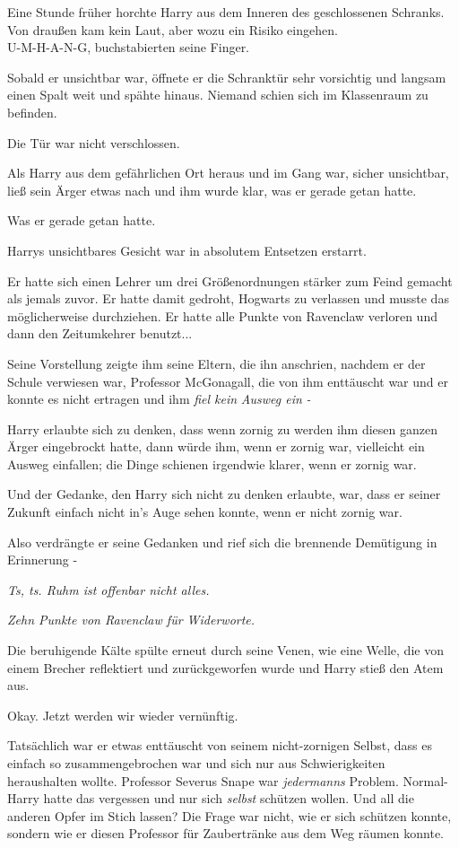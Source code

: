 {\hfill\break Eine Stunde früher horchte Harry aus dem Inneren des geschlossenen Schranks. Von draußen kam kein Laut, aber wozu ein Risiko eingehen.\\ U-M-H-A-N-G, buchstabierten seine Finger.

Sobald er unsichtbar war, öffnete er die Schranktür sehr vorsichtig und langsam einen Spalt weit und spähte hinaus. Niemand schien sich im Klassenraum zu befinden.

Die Tür war nicht verschlossen.

Als Harry aus dem gefährlichen Ort heraus und im Gang war, sicher unsichtbar, ließ sein Ärger etwas nach und ihm wurde klar, was er gerade getan hatte.

Was er gerade getan hatte.

Harrys unsichtbares Gesicht war in absolutem Entsetzen erstarrt.

Er hatte sich einen Lehrer um drei Größenordnungen stärker zum Feind gemacht als jemals zuvor. Er hatte damit gedroht, Hogwarts zu verlassen und musste das möglicherweise durchziehen. Er hatte alle Punkte von Ravenclaw verloren und dann den Zeitumkehrer benutzt...

Seine Vorstellung zeigte ihm seine Eltern, die ihn anschrien, nachdem er der Schule verwiesen war, Professor McGonagall, die von ihm enttäuscht war und er konnte es nicht ertragen und ihm \emph{fiel kein} \emph{Ausweg ein} \emph{-}

Harry erlaubte sich zu denken, dass wenn zornig zu werden ihm diesen ganzen Ärger eingebrockt hatte, dann würde ihm, wenn er zornig war, vielleicht ein Ausweg einfallen; die Dinge schienen irgendwie klarer, wenn er zornig war.

Und der Gedanke, den Harry sich nicht zu denken erlaubte, war, dass er seiner Zukunft einfach nicht in's Auge sehen konnte, wenn er nicht zornig war.

Also verdrängte er seine Gedanken und rief sich die brennende Demütigung in Erinnerung -

\emph{Ts, ts. Ruhm ist offenbar nicht alles.}

\emph{Zehn Punkte von Ravenclaw für Widerworte.}

Die beruhigende Kälte spülte erneut durch seine Venen, wie eine Welle, die von einem Brecher reflektiert und zurückgeworfen wurde und Harry stieß den Atem aus.

Okay. Jetzt werden wir wieder vernünftig.

Tatsächlich war er etwas enttäuscht von seinem nicht-zornigen Selbst, dass es einfach so zusammengebrochen war und sich nur aus Schwierigkeiten heraushalten wollte. Professor Severus Snape war \emph{jedermanns} Problem. Normal-Harry hatte das vergessen und nur sich \emph{selbst} schützen wollen. Und all die anderen Opfer im Stich lassen? Die Frage war nicht, wie er sich schützen konnte, sondern wie er diesen Professor für Zaubertränke aus dem Weg räumen konnte.

}
